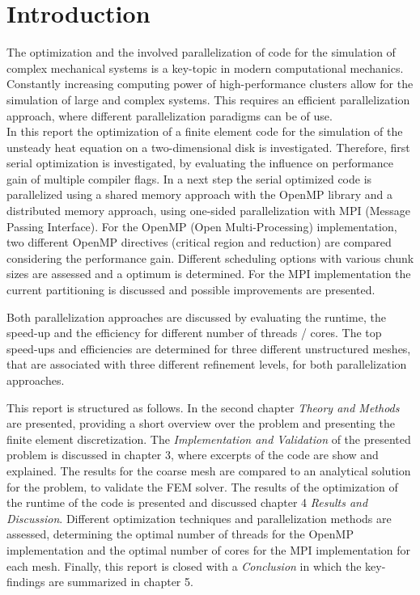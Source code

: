 \section{Introduction}

The optimization and the involved parallelization of code for the simulation of complex mechanical systems is a key-topic in modern computational mechanics. Constantly increasing computing power of high-performance clusters allow for the simulation of large and complex systems. This requires an efficient parallelization approach, where different parallelization paradigms can be of use. \\

In this report the optimization of a finite element code for the simulation of the unsteady heat equation on a two-dimensional disk is investigated. Therefore, first serial optimization is investigated, by evaluating the influence on performance gain of multiple compiler flags. In a next step the serial optimized code is parallelized using a shared memory approach with the OpenMP library and a distributed memory approach, using one-sided parallelization with MPI (Message Passing Interface). For the OpenMP (Open Multi-Processing) implementation, two different OpenMP directives (critical region and reduction) are compared considering the performance gain. Different scheduling options with various chunk sizes are assessed and a optimum is determined. For the MPI implementation the current partitioning is discussed and possible improvements are presented.

 Both parallelization approaches are discussed by evaluating the runtime, the speed-up and the efficiency for different number of threads / cores. The top speed-ups and efficiencies are determined for three different unstructured meshes, that are associated with three different refinement levels, for both parallelization approaches.  

 This report is structured as follows. In the second chapter \textit{Theory and Methods} are presented, providing a short overview over the problem and presenting the finite element discretization. The \textit{Implementation and Validation} of the presented problem is discussed in chapter 3, where excerpts of the code are show and explained. The results for the coarse mesh are compared to an analytical solution for the problem, to validate the FEM solver. The results of the optimization of the runtime of the code is presented and discussed chapter 4 \textit{Results and Discussion}. Different optimization techniques and parallelization methods are assessed, determining the optimal number of threads for the OpenMP implementation and the optimal number of cores for the MPI implementation for each mesh.  Finally, this report is closed with a \textit{Conclusion} in which the key-findings are summarized in chapter 5.
